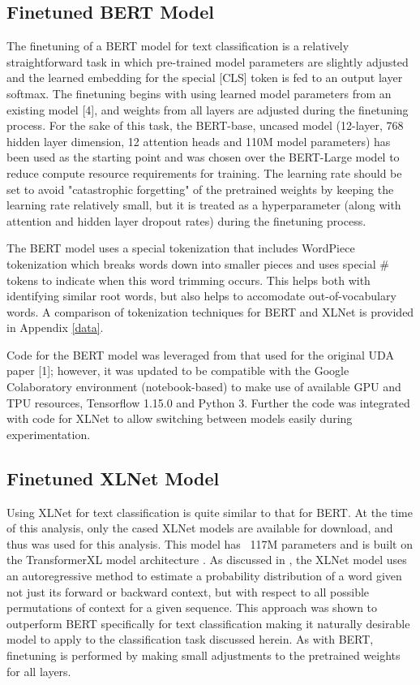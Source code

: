\documentclass[twoside,twocolumn,10pt]{article}
\begin{document}
\subsection{Finetuned BERT Model}

The finetuning of a BERT model for text classification is a relatively straightforward task in which pre-trained model parameters are slightly adjusted and the learned embedding for the special [CLS] token is fed to an output layer softmax. The finetuning begins with using learned model parameters from an existing model [4], and weights from all layers are adjusted during the finetuning process. For the sake of this task, the BERT-base, uncased model (12-layer, 768 hidden layer dimension, 12 attention heads and 110M model parameters) has been used as the starting point and was chosen over the BERT-Large model to reduce compute resource requirements for training. The learning rate should be set to avoid "catastrophic forgetting" of the pretrained weights by keeping the learning rate relatively small, but it is treated as a hyperparameter (along with attention and hidden layer dropout rates) during the finetuning process. 

The BERT model uses a special tokenization that includes WordPiece tokenization \cite{Schuster and Nakajima:2012} which breaks words down into smaller pieces and uses special \# tokens to indicate when this word trimming occurs. This helps both with identifying similar root words, but also helps to accomodate out-of-vocabulary words. A comparison of tokenization techniques for BERT and XLNet is provided in Appendix \ref{data}. 

Code for the BERT model was leveraged from that used for the original UDA paper [1]; however, it was updated to be compatible with the Google Colaboratory environment (notebook-based) to make use of available GPU and TPU resources, Tensorflow 1.15.0 and Python 3. Further the code was integrated with code for XLNet to allow switching between models easily during experimentation. 
\subsection{Finetuned XLNet Model}
Using XLNet for text classification is quite similar to that for BERT. At the time of this analysis, only the cased XLNet models are available for download, and thus was used for this analysis. This model has ~117M parameters and is built on the TransformerXL model architecture \cite{Dai:2019}. As discussed in \cite{Yang:2019}, the XLNet model uses an autoregressive method to estimate a probability distribution of a word given not just its forward or backward context, but with respect to all possible permutations of context for a given sequence. This approach was shown to outperform BERT specifically for text classification making it naturally desirable model to apply to the classification task discussed herein. As with BERT, finetuning is performed by making small adjustments to the pretrained weights for all layers.
\end{document}
